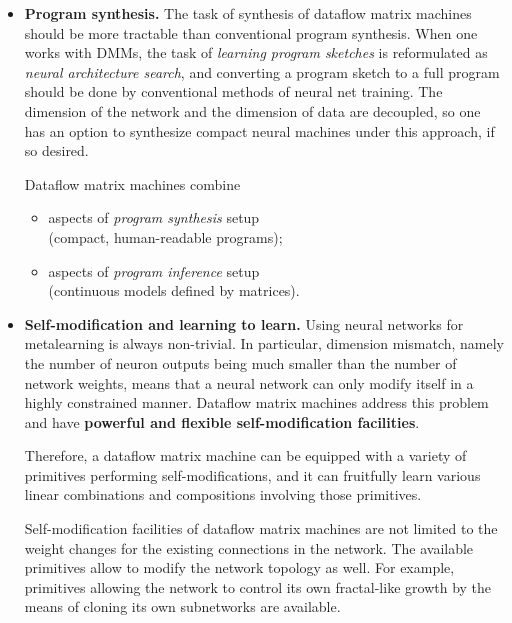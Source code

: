 \documentclass{article}
\begin{document}
\begin{itemize}

  \item {\bf Program synthesis.} The task of synthesis of dataflow matrix machines
should be more tractable than conventional program synthesis. When one works with DMMs, the task of
{\em learning program sketches} is reformulated as {\em neural architecture search},
and converting a program sketch to a full program should be done by
conventional methods of neural net training. The dimension of the network and the dimension
of data are decoupled, so one has an option to synthesize compact neural machines
under this approach, if so desired.

\vspace{0.1in}
Dataflow matrix machines combine

  \begin{itemize}
      \item aspects of {\em program synthesis} setup\\ (compact, human-readable programs);
      \item aspects of {\em program inference} setup\\ (continuous models defined by matrices).
  \end{itemize}

\vspace{0.1in}
\item {\bf Self-modification and learning to learn.} Using neural networks for metalearning
is always non-trivial. In particular, dimension mismatch, namely the number of neuron outputs 
being much smaller than the number of network weights,
means that a neural network
can only modify itself in a highly constrained manner. Dataflow matrix machines address
this problem and have {\bf powerful and flexible self-modification facilities}.

\vspace{0.1in}
Therefore, a dataflow matrix machine can be equipped with a variety of primitives
performing self-modifications, and it can fruitfully learn various linear combinations and
compositions involving those primitives.

\vspace{0.1in}
Self-modification facilities of dataflow matrix machines are not limited to the weight
changes for the existing connections in the network. The available primitives allow to
modify the network topology as well. For example, primitives allowing the network
to control its own fractal-like growth by the means of cloning its own subnetworks
are available.


\end{itemize}
\end{document}

